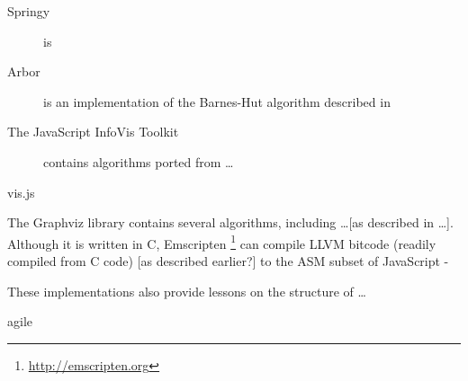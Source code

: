 \begin{description}
  \item[Springy] is 
  \item[Arbor] is an implementation of the Barnes-Hut algorithm described in  
  \item[The JavaScript InfoVis Toolkit] contains algorithms ported from \ldots
  \item[vis.js]
\end{description}

The Graphviz library contains several algorithms, including \ldots [as described in \ldots]. Although it is written in C, Emscripten \footnote{\url{http://emscripten.org}} can compile LLVM bitcode (readily compiled from C code) [as described earlier?] to the ASM subset of JavaScript -

These implementations also provide lessons on the structure of \ldots



agile
